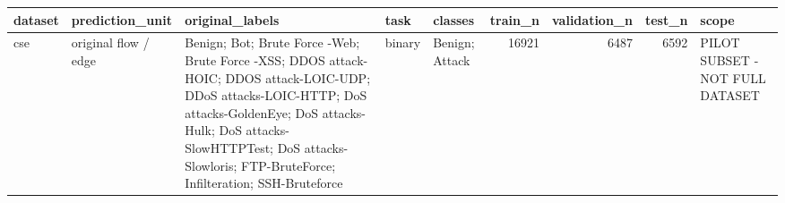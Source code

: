 \begin{tabular}{lllllrrrl}
\toprule
dataset & prediction\_unit & original\_labels & task & classes & train\_n & validation\_n & test\_n & scope \\
\midrule
cse & original flow / edge & Benign; Bot; Brute Force -Web; Brute Force -XSS; DDOS attack-HOIC; DDOS attack-LOIC-UDP; DDoS attacks-LOIC-HTTP; DoS attacks-GoldenEye; DoS attacks-Hulk; DoS attacks-SlowHTTPTest; DoS attacks-Slowloris; FTP-BruteForce; Infilteration; SSH-Bruteforce & binary & Benign; Attack & 16921 & 6487 & 6592 & PILOT SUBSET - NOT FULL DATASET \\
\bottomrule
\end{tabular}
